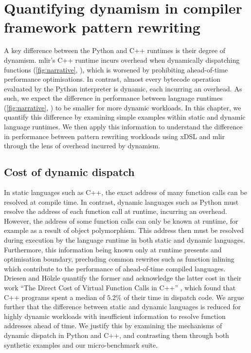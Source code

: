 \chapter{Quantifying dynamism in compiler framework pattern rewriting}
\label{chap:dynamism-pattern-rewriting}

A key difference between the Python and C++ runtimes is their degree of dynamism.
\ac{mlir}'s C++ runtime incurs overhead when dynamically dispatching functions (\autoref{fig:narrative}, ), which is worsened by prohibiting ahead-of-time performance optimisations. In contrast, almost every bytecode operation evaluated by the Python interpreter is dynamic, each incurring an overhead.
As such, we expect the difference in performance between language runtimes (\autoref{fig:narrative}, ) to be smaller for more dynamic workloads.
In this chapter, we quantify this difference by examining simple examples within static and dynamic language runtimes. We then apply this information to understand the difference in performance between pattern rewriting workloads using xDSL and \ac{mlir} through the lens of overhead incurred by dynamism.


\section{Cost of dynamic dispatch}
\label{chap:dynamism-pattern-rewriting-dispatch}

In static languages such as C++, the exact address of many function calls can be resolved at compile time. In contrast, dynamic languages such as Python must resolve the address of each function call at runtime, incurring an overhead.
However, the address of some function calls can only be known at runtime, for example as a result of object polymorphism. This address then must be resolved during execution by the language runtime in both static and dynamic languages. Furthermore, this information being known only at runtime presents and optimisation boundary, precluding common rewrites such as function inlining which contribute to the performance of ahead-of-time compiled languages.
Driesen and H\"olzle quantify the former and acknowledge the latter cost in their work ``The Direct Cost of Virtual Function Calls in C++'' \cite{driesenDirectCostVirtual1996}, which found that C++ programs spent a median of $5.2\%$ of their time in dispatch code.
We argue further that the difference between static and dynamic languages is reduced for highly dynamic workloads with insufficient information to resolve function addresses ahead of time.
We justify this by examining the mechanisms of dynamic dispatch in Python and C++, and contrasting them through both synthetic examples and our micro-benchmark suite.

